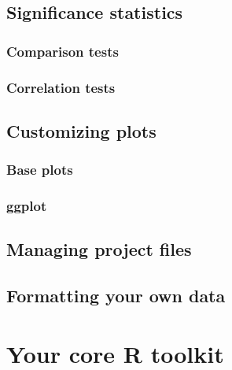 \documentclass[
]{book}
\begin{document}
\hypertarget{significance-statistics}{%
\section{Significance statistics}\label{significance-statistics}}

\hypertarget{comparison-tests}{%
\subsection{Comparison tests}\label{comparison-tests}}

\hypertarget{correlation-tests}{%
\subsection{Correlation tests}\label{correlation-tests}}

\hypertarget{customizing-plots}{%
\section{Customizing plots}\label{customizing-plots}}

\hypertarget{base-plots-1}{%
\subsection{Base plots}\label{base-plots-1}}

\hypertarget{ggplot-1}{%
\subsection{ggplot}\label{ggplot-1}}

\hypertarget{managing-project-files}{%
\section{Managing project files}\label{managing-project-files}}

\hypertarget{formatting-your-own-data}{%
\section{Formatting your own data}\label{formatting-your-own-data}}

\hypertarget{your-core-r-toolkit}{%
\chapter{Your core R toolkit}\label{your-core-r-toolkit}}
\end{document}
